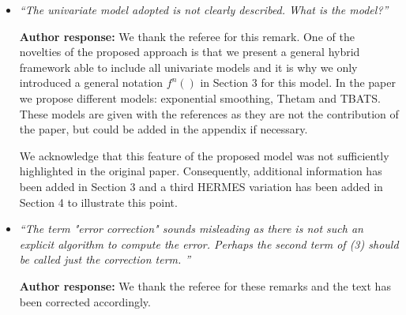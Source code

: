\documentclass[10pt]{article} %
\begin{document}
\begin{itemize}
	
	\item {\em ``The univariate model adopted is not clearly described. What is the model?''} \medskip
	
	\textbf{Author response:} We thank the referee for this remark. One of the novelties of the proposed approach is that we present a general hybrid framework able to include all univariate models and it is why we only introduced a general notation $f^n()$ in Section 3 for this model. In the paper we propose different models: exponential smoothing, Thetam and TBATS. These models are given with the references as they are not the contribution of the paper, but could be added in the appendix if necessary.


We acknowledge that this feature of the proposed model was not sufficiently highlighted in the original paper. Consequently, additional information has been added in Section 3 and a third HERMES variation has been added in Section 4 to illustrate this point.\\
	
	\item {\em ``The term "error correction" sounds misleading as there is not such an explicit algorithm to compute the error. Perhaps the second term of (3) should be called just the correction term. ''} \medskip
	
	\textbf{Author response:} We thank the referee for these remarks and the text has been corrected accordingly.\\
	

\end{itemize}
\end{document}
